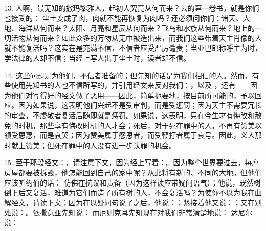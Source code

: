 13. 人啊，最无知的撒玛黎雅人，起初人究竟从何而来？去的第一卷书，就是你们也接受的：  尘土变成了肉，肉就不能再恢复为肉吗？还必须问你们：诸天、大地、海洋从何而来？太阳、月亮和星辰从何而来？飞鸟和水族从何而来？地上的一切活物从何而来？如此众多的万物从无中被造出来，而我们这些带着天主肖像的人就不能复活吗？这实在是充满不信，不信者应受严厉谴责；当亚巴郎称呼主为时，学法律的人却不信；当经上写人出于尘土时，读者却不信。\par

14. 这些问题是为他们，不信者准备的；但先知的话是为我们相信的人。然而，有些使用先知书的人也不信所写的，并引用经文来反对我们：，以及 ，还有——因为他们对写得好的经文做了恶用——因此，简单扼要地，按目前所可能的，予以回应。因为如果说，这表明他们兴起不是受审判，而是受惩罚；因为天主不需要冗长的审查，不虔敬者复活后随即就是惩罚。如果说，这表明，只在今生才有悔改和赦免的时机，那些享有悔改时机的人才会；死后，对于死在罪中的人，不再有赞美以领受恩惠，而是哀哭；因为赞美属于感恩者，而受鞭打者属于哀号。因此，义人那时献上赞美；但死在罪中的人没有进一步认罪的机会。\par

15. 至于那段经文：，请注意下文，因为经上写着：。因为整个世界要过去，每座房屋都要被拆毁，他怎能回到自己的家中呢？从此将有新的、不同的大地。但他们应该听约伯的话：  仿佛在抗议和责备（因为这样读应带疑问语气）；他说，既然树倒下后又复活，难道为它们而造了所有树的人，不会复活吗？为使你不以为我在曲解经文，请读下文；因为在以疑问句说了之后，他说：；紧接着他又说：；又在别处说：。依撒意亚先知说：  而厄则克耳先知现在对我们非常清楚地说：  达尼尔说： \par

